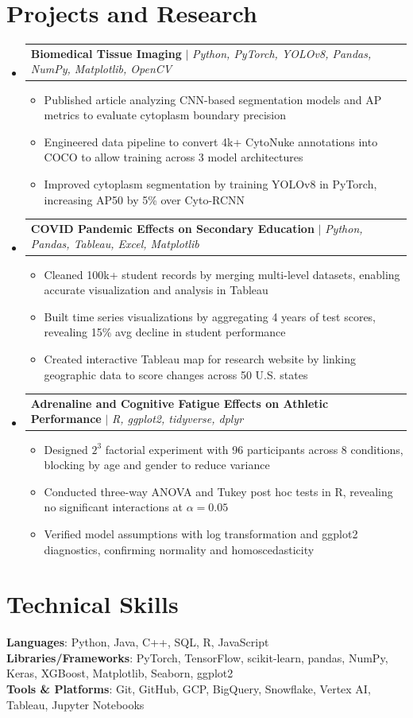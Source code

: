 \documentclass[letterpaper,11pt]{article}
\makeatletter
\newcommand{\resumeItem}[1]{
  \item\small{#1}
}
\newcommand{\resumeProjectHeading}[2]{
    \item
    \begin{tabular*}{\textwidth}{l@{\extracolsep{\fill}}r}
      #1 & #2 \\
    \end{tabular*}\vspace{-7pt}
}
\newcommand{\resumeSubHeadingListStart}{\begin{itemize}[leftmargin=0in, label={}]}
\newcommand{\resumeSubHeadingListEnd}{\end{itemize}}
\newcommand{\resumeItemListStart}{\begin{itemize}[itemsep= 1.5pt, parsep=0pt]}
\newcommand{\resumeItemListEnd}{\end{itemize}\vspace{-5pt}}
\makeatother
\begin{document}
\section{Projects and Research}
    \resumeSubHeadingListStart
      \resumeProjectHeading
          {\textbf{Biomedical Tissue Imaging} $|$ \textit{Python, PyTorch, YOLOv8, Pandas, NumPy, Matplotlib, OpenCV}}{}
          \resumeItemListStart
            \resumeItem{Published article analyzing CNN-based segmentation models and AP metrics to evaluate cytoplasm boundary precision}
            \resumeItem{Engineered data pipeline to convert 4k+ CytoNuke annotations into COCO to allow training across 3 model architectures}
            \resumeItem{Improved cytoplasm segmentation by training YOLOv8 in PyTorch, increasing AP50 by 5\% over Cyto-RCNN}
          \resumeItemListEnd
      \resumeProjectHeading
          {\textbf{COVID Pandemic Effects on Secondary Education} $|$ \textit{Python, Pandas, Tableau, Excel, Matplotlib}}{}
          \resumeItemListStart
            \resumeItem{Cleaned 100k+ student records by merging multi-level datasets, enabling accurate visualization and analysis in Tableau}
            \resumeItem{Built time series visualizations by aggregating 4 years of test scores, revealing 15\% avg decline in student performance}
            \resumeItem{Created interactive Tableau map for research website by linking geographic data to score changes across 50 U.S. states}
          \resumeItemListEnd
      \resumeProjectHeading
          {\textbf{Adrenaline and Cognitive Fatigue Effects on Athletic Performance} $|$ \textit{R, ggplot2, tidyverse, dplyr}}{}
          \resumeItemListStart
            \resumeItem{Designed $2^3$ factorial experiment with 96 participants across 8 conditions, blocking by age and gender to reduce variance}
            \resumeItem{Conducted three-way ANOVA and Tukey post hoc tests in R, revealing no significant interactions at $\alpha = 0.05$}
            \resumeItem{Verified model assumptions with log transformation and ggplot2 diagnostics, confirming normality and homoscedasticity}
          \resumeItemListEnd
    \resumeSubHeadingListEnd
\section{Technical Skills}
 \begin{itemize}[leftmargin=0in, label={}]
    \small{\item{
     \textbf{Languages}{: Python, Java, C++, SQL, R, JavaScript} \\
     \textbf{Libraries/Frameworks}{: PyTorch, TensorFlow, scikit-learn, pandas, NumPy, Keras, XGBoost, Matplotlib, Seaborn, ggplot2} \\
     \textbf{Tools \& Platforms}{: Git, GitHub, GCP, BigQuery, Snowflake, Vertex AI, Tableau, Jupyter Notebooks}
    }}
 \end{itemize}
\end{document}
